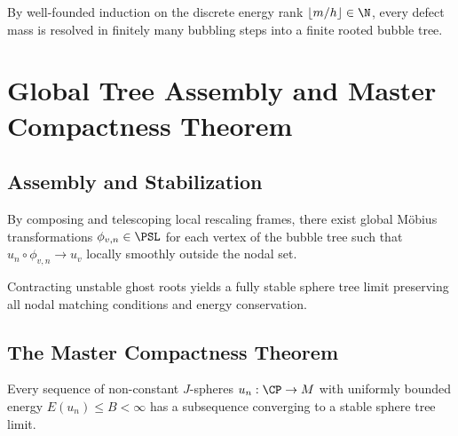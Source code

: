 \begin{theorem}
\label{b07:local_tree}
By well-founded induction on the discrete energy rank $\lfloor m / h \rfloor \in \N$, every defect mass is resolved in finitely many bubbling steps into a finite rooted bubble tree.
\end{theorem}

\chapter{Global Tree Assembly and Master Compactness Theorem}

\section{Assembly and Stabilization}

\begin{theorem}
\label{g01:global_assembly}
By composing and telescoping local rescaling frames, there exist global Möbius transformations $\phi_{v, n} \in \PSL$ for each vertex of the bubble tree such that $u_n \circ \phi_{v, n} \to u_v$ locally smoothly outside the nodal set.
\end{theorem}

\begin{theorem}
\label{g02:root_stabilization}
Contracting unstable ghost roots yields a fully stable sphere tree limit preserving all nodal matching conditions and energy conservation.
\end{theorem}

\section{The Master Compactness Theorem}

\begin{theorem}
\label{g03:master_compactness}
Every sequence of non-constant $J$-spheres $u_n : \CP \to M$ with uniformly bounded energy $E(u_n) \le B < \infty$ has a subsequence converging to a stable sphere tree limit.
\end{theorem}

